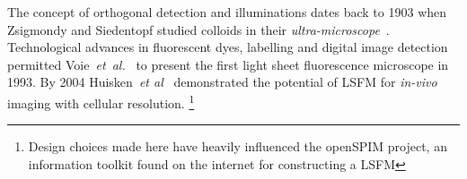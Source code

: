 \pagebreak

The concept of orthogonal detection and illuminations dates back to 1903 when Zsigmondy and Siedentopf studied colloids in their \textit{\gls{ultra-microscope}}~\cite{siedentpf_uber_1903}.
Technological advances in fluorescent dyes, labelling and digital image detection permitted Voie~\emph{et~al.}~\cite{voie_orthogonal-plane_1993}
to present the first light sheet fluorescence microscope in 1993.
By 2004 Huisken~\emph{et al}~\cite{huisken_optical_2004-1}
demonstrated the potential of \gls{LSFM} for \emph{in-vivo} imaging with cellular resolution.
\footnote{Design choices made here have heavily influenced the \gls{openSPIM} project, an information toolkit found on the internet for constructing a \gls{LSFM}}


